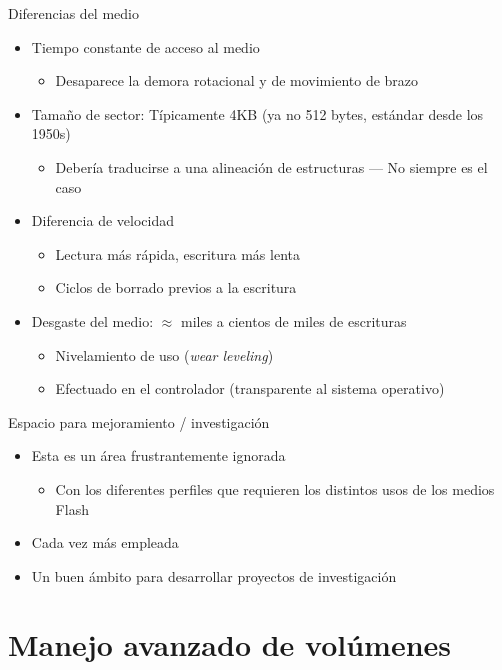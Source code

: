 \documentclass[presentation]{beamer}
\begin{document}
\begin{frame}[label={sec:org8f0e752}]{Diferencias del medio}
\begin{itemize}
\item Tiempo constante de acceso al medio
\begin{itemize}
\item Desaparece la demora rotacional y de movimiento de brazo
\end{itemize}
\item Tamaño de sector: Típicamente 4KB (ya no 512 bytes, estándar desde
los 1950s)
\begin{itemize}
\item Debería traducirse a una alineación de estructuras — No siempre
es el caso
\end{itemize}
\item Diferencia de velocidad
\begin{itemize}
\item Lectura más rápida, escritura más lenta
\item Ciclos de borrado previos a la escritura
\end{itemize}
\item Desgaste del medio: \(\approx\) miles a cientos de miles de escrituras
\begin{itemize}
\item Nivelamiento de uso (\emph{wear leveling})
\item Efectuado en el controlador (transparente al sistema operativo)
\end{itemize}
\end{itemize}
\end{frame}

\begin{frame}[label={sec:org389bb5a}]{Espacio para mejoramiento / investigación}
\begin{itemize}
\item Esta es un área frustrantemente ignorada
\begin{itemize}
\item Con los diferentes perfiles que requieren los distintos usos de
los medios Flash
\end{itemize}
\item Cada vez más empleada
\item Un buen ámbito para desarrollar proyectos de investigación
\end{itemize}
\end{frame}

\section{Manejo avanzado de volúmenes}
\label{sec:orgd8e3e0c}
\end{document}
